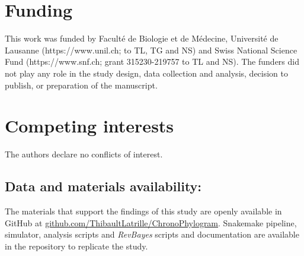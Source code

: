 \documentclass{article}
\begin{document}
\section*{Funding}
This work was funded by Faculté de Biologie et de Médecine, Université de Lausanne (https://www.unil.ch; to TL, TG and NS) and Swiss National Science Fund (https://www.snf.ch; grant 315230-219757 to TL and NS). The funders did not play any role in the study design, data collection and analysis, decision to publish, or preparation of the manuscript.

\section*{Competing interests}
The authors declare no conflicts of interest.

\subsection*{Data and materials availability:}
The materials that support the findings of this study are openly available in GitHub at \href{https://github.com/ThibaultLatrille/ChronoPhylogram}{github.com/ThibaultLatrille/ChronoPhylogram}.
Snakemake pipeline, simulator, analysis scripts and \textit{RevBayes} scripts and documentation are available in the repository to replicate the study.
\end{document}
